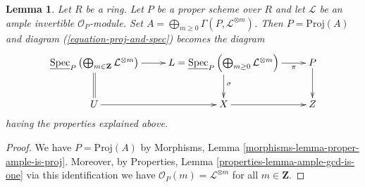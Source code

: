 \documentclass[10pt,a4paper]{amsart}
\theoremstyle{plain}
\newtheorem{lemma}[subsection]{Lemma}
\theoremstyle{definition}
\theoremstyle{remark}
\numberwithin{equation}{subsection}
\def\Spec{\mathop{\mathrm{Spec}}}
\begin{document}
\begin{lemma}
\label{lemma-apply-proj-spec}
Let $R$ be a ring. Let $P$ be a proper scheme over $R$ and let
$\mathcal{L}$ be an ample invertible $\mathcal{O}_P$-module.
Set $A = \bigoplus_{m \geq 0} \Gamma(P, \mathcal{L}^{\otimes m})$.
Then $P = \text{Proj}(A)$ and diagram (\ref{equation-proj-and-spec})
becomes the diagram
$$
\xymatrix{
\underline{\Spec}_P \left(
\bigoplus\nolimits_{m \in \mathbf{Z}} \mathcal{L}^{\otimes m}
\right)
\ar[r] \ar@{=}[d] &
L =
\underline{\Spec}_P \left(
\bigoplus\nolimits_{m \geq 0} \mathcal{L}^{\otimes m}
\right) \ar[d]^\sigma \ar[r]_-\pi & P \ar[d] \\
U \ar[r] & X \ar[r] & Z
}
$$
having the properties explained above.
\end{lemma}

\begin{proof}
We have $P = \text{Proj}(A)$ by
Morphisms, Lemma \ref{morphisms-lemma-proper-ample-is-proj}.
Moreover, by Properties, Lemma \ref{properties-lemma-ample-gcd-is-one}
via this identification we have $\mathcal{O}_P(m) = \mathcal{L}^{\otimes m}$
for all $m \in \mathbf{Z}$.
\end{proof}
\end{document}
